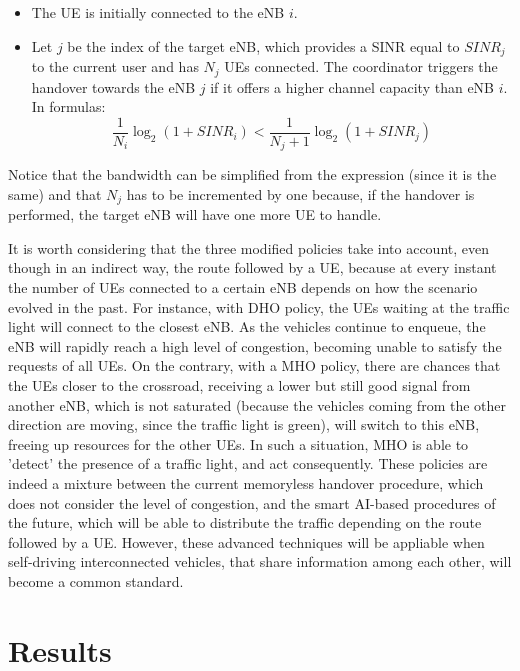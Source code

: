 \documentclass[conference,10pt]{IEEEtran}
\begin{document}
\begin{enumerate}
\begin{itemize}
	\item The UE is initially connected to the eNB $i$.
	\item Let $j$ be the index of the target eNB, which provides a SINR equal to $SINR_j$ to the current user and has $N_j$ UEs connected. The coordinator triggers the handover towards the eNB $j$ if it offers a higher channel capacity than eNB $i$. In formulas:
	$$
	\frac{1}{N_i} \log_2(1+SINR_i) < \frac{1}{N_j+1} \log_2(1+SINR_j)
	$$ 
\end{itemize}
\noindent Notice that the bandwidth can be simplified from the expression (since it is the same) and that $N_j$ has to be incremented by one because, if the handover is performed, the target eNB will have one more UE to handle.
\end{enumerate}

It is worth considering that the three modified policies take into account, even though in an indirect way, the route followed by a UE, because at every instant the number of UEs connected to a certain eNB depends on how the scenario evolved in the past. For instance, with DHO policy, the UEs waiting at the traffic light will connect to the closest eNB. As the vehicles continue to enqueue, the eNB will rapidly reach a high level of congestion, becoming unable to satisfy the requests of all UEs. On the contrary, with a MHO policy, there are chances that the UEs closer to the crossroad, receiving a lower but still good signal from another eNB, which is not saturated (because the vehicles coming from the other direction are moving, since the traffic light is green), will switch to this eNB, freeing up resources for the other UEs. In such a situation, MHO is able to 'detect' the presence of a traffic light, and act consequently. These policies are indeed a mixture between the current memoryless handover procedure, which does not consider the level of congestion, and the smart AI-based procedures of the future, which will be able to distribute the traffic depending on the route followed by a UE. However, these advanced techniques will be appliable when self-driving interconnected vehicles, that share information among each other, will become a common standard.

\section{Results}\label{sec:res}
\end{document}
